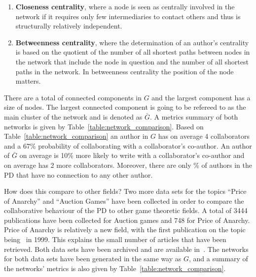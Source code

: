 \documentclass{article}
\theoremstyle{definition}
\newcommand{\isolatedpercentage}{}
\newcommand{\connectedcomponents}{}
\newcommand{\largestcc}{}
\begin{document}
\begin{enumerate}
    \item \textbf{Closeness centrality}, where a node
    is seen as centrally involved in the network if it requires only few
    intermediaries to contact others and thus is structurally relatively
    independent.
    \item \textbf{Betweenness centrality},
    where the determination of an author's centrality is based on the quotient
    of the number of all shortest paths between nodes in the network that
    include the node in question and the number of all shortest paths in the
    network. In betweenness centrality the position of the node matters.
\end{enumerate}

There are a total of
\connectedcomponents connected components in \(G\) and the largest component has
a size of \largestcc nodes. The largest connected component is going to be
refereed to as the main cluster of the network and is denoted as \(\bar{G}\). A
metrics summary of both networks is given
by Table~\ref{table:network_comparison}.
Based on Table~\ref{table:network_comparison} an author in \(G\) has on
average 4 collaborators and a 67\% probability of collaborating with a
collaborator's co-author. An author of \(\bar{G}\) on average is 10\% more likely
to write with a collaborator's co-author and on average has 2 more
collaborators. Moreover, there are only \isolatedpercentage\% of authors in the
PD that have no connection to any other author.

How does this compare to other fields? Two more data sets for the topics
``Price of Anarchy'' and ``Auction Games'' have been collected in order to
compare the collaborative behaviour of the PD to other game theoretic fields. A
total of 3444 publications have been collected for Auction games and 748 for
Price of Anarchy. Price of Anarchy is relatively a new field, with the first
publication on the topic being~\cite{Koutsoupias1999} in 1999. This explains the
small number of articles that have been retrieved. Both data sets have been
archived and are available in~\cite{auction_data_2018, anarchy_data_2018}.
The networks for both data sets have been generated in the same way as \(G\),
and a summary of the networks' metrics is also given by Table~\ref{table:network_comparison}.
\end{document}

